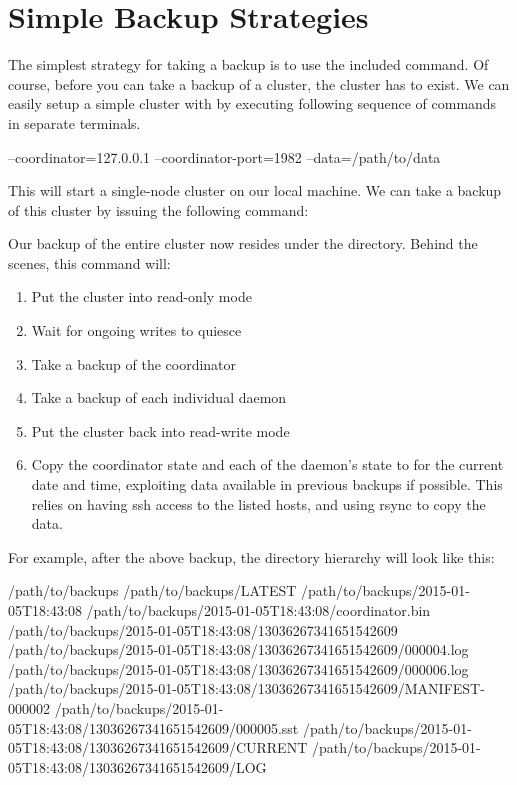\section{Simple Backup Strategies}

The simplest strategy for taking a backup is to use the included
 command.  Of course, before you can take a backup of a
cluster, the cluster has to exist.  We can easily setup a simple cluster with by
executing following sequence of commands in separate terminals.

\begin{consolecode}
                     --coordinator=127.0.0.1 --coordinator-port=1982 --data=/path/to/data
\end{consolecode}

This will start a single-node cluster on our local machine.  We can take a
backup of this cluster by issuing the following command:

\begin{consolecode}
\end{consolecode}

Our backup of the entire cluster now resides under the 
directory.  Behind the scenes, this command will:

\begin{enumerate}
\item Put the cluster into read-only mode
\item Wait for ongoing writes to quiesce
\item Take a backup of the coordinator
\item Take a backup of each individual daemon
\item Put the cluster back into read-write mode
\item Copy the coordinator state and each of the daemon's state to
     for the current date and time,
    exploiting data available in previous backups if possible.  This relies on
    having ssh access to the listed hosts, and using rsync to copy the data.
\end{enumerate}

For example, after the above backup, the directory hierarchy will look like
this:

\begin{consolecode}
/path/to/backups
/path/to/backups/LATEST
/path/to/backups/2015-01-05T18:43:08
/path/to/backups/2015-01-05T18:43:08/coordinator.bin
/path/to/backups/2015-01-05T18:43:08/13036267341651542609
/path/to/backups/2015-01-05T18:43:08/13036267341651542609/000004.log
/path/to/backups/2015-01-05T18:43:08/13036267341651542609/000006.log
/path/to/backups/2015-01-05T18:43:08/13036267341651542609/MANIFEST-000002
/path/to/backups/2015-01-05T18:43:08/13036267341651542609/000005.sst
/path/to/backups/2015-01-05T18:43:08/13036267341651542609/CURRENT
/path/to/backups/2015-01-05T18:43:08/13036267341651542609/LOG
\end{consolecode}

